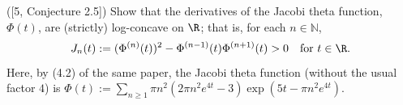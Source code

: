 ([5, Conjecture 2.5])  Show that the derivatives of the Jacobi theta function, $\Phi(t)$, are (strictly) log-concave on $\R$; that is, for each $n\in\mathbb N$,
\[J_n(t):=(\Phi^{(n)}(t))^2-\Phi^{(n-1)}(t)\Phi^{(n+1)}(t)>0\quad\text{for }t\in\R.\]
Here, by (4.2) of the same paper, the Jacobi theta function (without the usual factor $4$) is $\Phi(t):=\sum_{n\ge1}\pi n^2\left(2\pi n^2e^{4t}-3\right)\exp\left(5t-\pi n^2e^{4t}\right)$.
